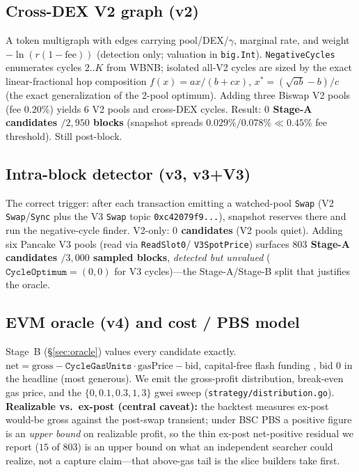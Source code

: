 \documentclass[11pt]{article}
\newcommand{\code}[1]{\texttt{#1}}
\begin{document}
\subsection{Cross-DEX V2 graph (v2)}
A token multigraph with edges carrying pool/DEX/$\gamma$, marginal rate, and weight
$-\ln(r(1-\text{fee}))$ (detection only; valuation in \code{big.Int}).
\code{NegativeCycles} enumerates cycles $2..K$ from WBNB; isolated all-V2 cycles are
sized by the exact linear-fractional hop composition $f(x)=ax/(b+cx)$,
$x^\ast=(\sqrt{ab}-b)/c$ (the exact generalization of the 2-pool optimum). Adding
three Biswap V2 pools (fee $0.20\%$) yields 6 V2 pools and cross-DEX cycles. Result:
\textbf{$0$ Stage-A candidates $/2{,}950$ blocks} (snapshot spreads $0.029\%/0.078\%
\ll 0.45\%$ fee threshold). Still post-block.

\subsection{Intra-block detector (v3, v3+V3)}
The correct trigger: after each transaction emitting a watched-pool \code{Swap} (V2
\code{Swap}/\code{Sync} plus the V3 \code{Swap} topic \code{0xc42079f9...}), snapshot
reserves there and run the negative-cycle finder. V2-only: \textbf{$0$ candidates}
(V2 pools quiet). Adding six Pancake V3 pools (read via \code{ReadSlot0}/
\code{V3SpotPrice}) surfaces \textbf{$803$ Stage-A candidates $/3{,}000$ sampled
blocks}, \emph{detected but unvalued} ($\code{CycleOptimum}=(0,0)$ for V3
cycles)---the Stage-A/Stage-B split that justifies the oracle.

\subsection{EVM oracle (v4) and cost / PBS model}
Stage~B (\S\ref{sec:oracle}) values every candidate exactly. $\text{net}=\text{gross}
-\code{CycleGasUnits}\cdot\text{gasPrice}-\text{bid}$, capital-free flash funding
\cite{qin2021flashloans}, bid $0$ in the headline (most generous). We emit the
gross-profit distribution, break-even gas price, and the $\{0,0.1,0.3,1,3\}$ gwei
sweep (\code{strategy/distribution.go}). \textbf{Realizable vs.\ ex-post (central
caveat):} the backtest measures ex-post would-be gross against the post-swap
transient; under BSC PBS \cite{bep322,wang2025binance} a positive figure is an
\emph{upper bound} on realizable profit, so the thin ex-post net-positive residual
we report ($15$ of $803$) is an upper bound on what an independent searcher could
realize, not a capture claim---that above-gas tail is the slice builders take first.
\end{document}
